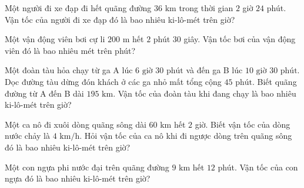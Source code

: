 \begin{ex} %
Một người đi xe đạp đi hết quãng đường $36\text{ km}$ trong thời gian $2$ giờ $24$ phút. Vận tốc của người đi xe đạp đó là bao nhiêu ki-lô-mét trên giờ?
\end{ex}

\begin{ex} %
Một vận động viên bơi cự li $200\text{ m}$ hết $2$ phút $30$ giây. Vận tốc bơi của vận động viên đó là bao nhiêu mét trên phút?
\end{ex}

\begin{ex} %
Một đoàn tàu hỏa chạy từ ga A lúc $6\text{ giờ } 30\text{ phút}$ và đến ga B lúc $10\text{ giờ } 30\text{ phút}$. Dọc đường tàu dừng đón khách ở các ga nhỏ mất tổng cộng $45\text{ phút}$. Biết quãng đường từ A đến B dài $195\text{ km}$. Vận tốc của đoàn tàu khi đang chạy là bao nhiêu ki-lô-mét trên giờ?
\end{ex}

\begin{ex} %
Một ca nô đi xuôi dòng quãng sông dài $60\text{ km}$ hết $2$ giờ. Biết vận tốc của dòng nước chảy là $4\text{ km/h}$. Hỏi vận tốc của ca nô khi đi ngược dòng trên quãng sông đó là bao nhiêu ki-lô-mét trên giờ?
\end{ex}

\begin{ex} %
Một con ngựa phi nước đại trên quãng đường $9\text{ km}$ hết $12$ phút. Vận tốc của con ngựa đó là bao nhiêu ki-lô-mét trên giờ?
\end{ex}
